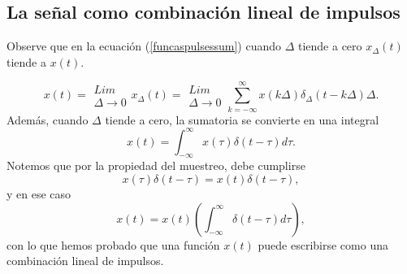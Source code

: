 \subsection{La se\~{n}al como combinaci\'{o}n lineal de impulsos}

Observe que en la ecuaci\'{o}n (\ref{funcaspulsessum}) cuando 
$\Delta$ tiende a cero $x_{\Delta }\left(t\right)$ tiende a 
$x\left(t\right) .$

\begin{equation}
        x\left( t\right) =      
\begin{array}{l}
    Lim \\ 
    \Delta \rightarrow 0
\end{array}
x_{\Delta }\left( t\right) = 
\begin{array}{l}
    Lim \\ 
    \Delta \rightarrow 0
\end{array}
   \sum_{k=-\infty }^{\infty }x\left( k\Delta \right) \delta _{\Delta }\left(t-k\Delta \right) \Delta .
\end{equation}
Adem\'{a}s, cuando $\Delta $ tiende a cero, la sumatoria se convierte en una integral 
\begin{equation}
        x\left( t\right) =\int_{-\infty }^{\infty }x\left( \tau \right) \delta\left( t-\tau \right) d\tau .
\end{equation}
Notemos que por la propiedad del muestreo, debe cumplirse 
\begin{equation}
   x\left( \tau \right) \delta \left( t-\tau \right) = 
     x\left( t\right) \delta \left( t-\tau \right) ,
\end{equation}
y en ese caso 
\begin{equation}
 x\left( t\right) = 
  x\left( t\right) \left( \int_{-\infty }^{\infty }\delta \left( t-\tau \right) d\tau \right),
\end{equation}
con lo que hemos probado que una funci\'{o}n $x(t)$ puede escribirse
como una combinaci\'{o}n lineal de impulsos.

